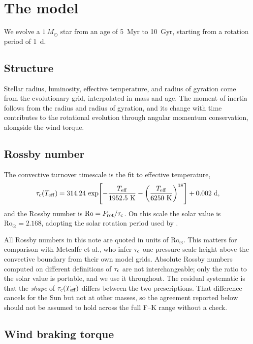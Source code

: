 \documentclass[11pt]{article}
\newcommand{\Rosun}{\mathrm{Ro_\odot}}
\newcommand{\Msun}{M_\odot}
\begin{document}
\section{The model}

We evolve a $1~\Msun$ star from an age of 5~Myr to 10~Gyr, starting from a
rotation period of 1~d.

\subsection{Structure}

Stellar radius, luminosity, effective temperature, and radius of gyration come
from the \citet{Baraffe15} evolutionary grid, interpolated in mass and age. The
moment of inertia follows from the radius and radius of gyration, and its
change with time contributes to the rotational evolution through angular
momentum conservation, alongside the wind torque.

\subsection{Rossby number}

The convective turnover timescale is the \citet{CranmerSaar11} fit to effective
temperature,
%
\begin{equation}
  \tau_{\rm c}(T_{\rm eff}) = 314.24\,
    \exp\!\left[-\frac{T_{\rm eff}}{1952.5~\mathrm{K}}
      - \left(\frac{T_{\rm eff}}{6250~\mathrm{K}}\right)^{18}\right]
    + 0.002~\mathrm{d},
\end{equation}
%
and the Rossby number is $\mathrm{Ro} = P_{\rm rot}/\tau_{\rm c}$. On this
scale the solar value is $\Rosun = 2.168$, adopting the solar rotation period
used by \citet{Matt15}.

All Rossby numbers in this note are quoted in units of $\Rosun$. This matters
for comparison with Metcalfe et al., who infer $\tau_{\rm c}$ one pressure
scale height above the convective boundary from their own model grids. Absolute
Rossby numbers computed on different definitions of $\tau_{\rm c}$ are not
interchangeable; only the ratio to the solar value is portable, and we use it
throughout. The residual systematic is that the \emph{shape} of
$\tau_{\rm c}(T_{\rm eff})$ differs between the two prescriptions. That
difference cancels for the Sun but not at other masses, so the agreement
reported below should not be assumed to hold across the full F--K range without
a check.

\subsection{Wind braking torque}
\end{document}
